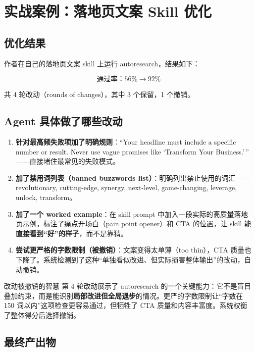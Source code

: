 \section{实战案例：落地页文案 Skill 优化}

\subsection{优化结果}

作者在自己的落地页文案 skill 上运行 autoresearch，结果如下：

$$\text{通过率：} 56\% \longrightarrow 92\%$$

共 4 轮改动（rounds of changes），其中 3 个保留，1 个撤销。

\subsection{Agent 具体做了哪些改动}

\begin{enumerate}
    \item \textbf{针对最高频失败项加了明确规则}：``Your headline must include a specific number or result. Never use vague promises like `Transform Your Business.'\,'' ——直接堵住最常见的失败模式。

    \item \textbf{加了禁用词列表（banned buzzwords list）}：明确列出禁止使用的词汇——revolutionary, cutting-edge, synergy, next-level, game-changing, leverage, unlock, transform。

    \item \textbf{加了一个 worked example}：在 skill prompt 中加入一段实际的高质量落地页示例，标注了痛点开场白（pain point opener）和 CTA 的位置，让 skill 能\textbf{直接看到``好''的样子}，而不是靠猜。

    \item \textbf{尝试更严格的字数限制（被撤销）}：文案变得太单薄（too thin），CTA 质量也下降了。系统检测到了这种``单独看似改进、但实际损害整体输出''的改动，自动撤销。
\end{enumerate}

\begin{knowledgebox}{改动被撤销的智慧}
第 4 轮改动展示了 autoresearch 的一个关键能力：它不是盲目叠加约束，而是能识别\textbf{局部改进但全局退步}的情况。更严的字数限制让``字数在 150 词以内''这项检查更容易通过，但牺牲了 CTA 质量和内容丰富度。系统权衡了整体得分后选择撤销。
\end{knowledgebox}

\subsection{最终产出物}


